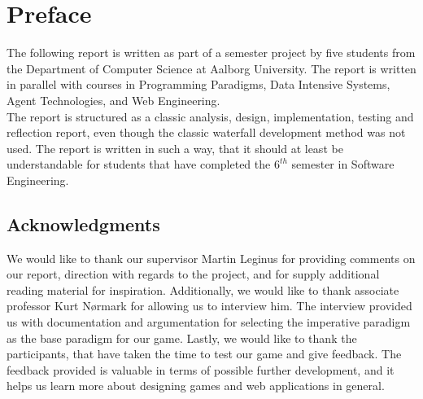 \chapter*{Preface}

The following report is written as part of a semester project by five students from the Department of Computer Science at Aalborg University.
The report is written in parallel with courses in Programming Paradigms, Data Intensive Systems, Agent Technologies, and Web Engineering.
\\

The report is structured as a classic analysis, design, implementation, testing and reflection report, even though the classic waterfall development method was not used.
The report is written in such a way, that it should at least be understandable for students that have completed the $6^{th}$ semester in Software Engineering.

\section*{Acknowledgments}

We would like to thank our supervisor Martin Leginus for providing comments on our report, direction with regards to the project, and for supply additional reading material for inspiration.
Additionally, we would like to thank associate professor Kurt N{\o}rmark for allowing us to interview him.
The interview provided us with documentation and argumentation for selecting the imperative paradigm as the base paradigm for our game.
Lastly, we would like to thank the participants, that have taken the time to test our game and give feedback.
The feedback provided is valuable in terms of possible further development, and it helps us learn more about designing games and web applications in general.
